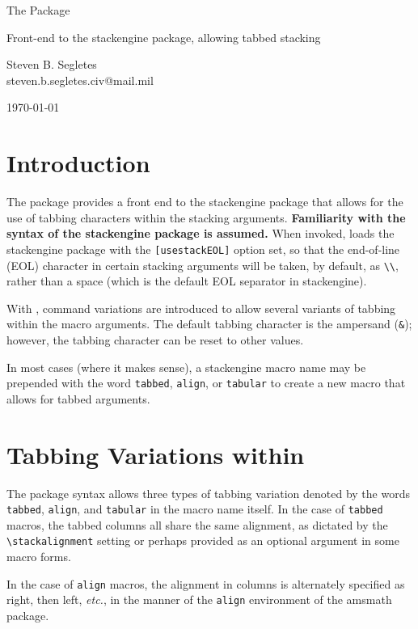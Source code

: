 \documentclass{article}
\def\ste{\textsf{stackengine}} \def\bs{\texttt{\char'134}} \let\vb\verb
\begin{document}
\begin{center} \LARGE The {\tst} Package\\ \rule{0em}{.7em}\small
Front-end to the {\ste} package, allowing tabbed stacking\\ \rule{0em}{2.7em}\large
Steven B. Segletes\\ steven.b.segletes.civ@mail.mil\\
\rule{0em}{1.7em}\today\\ \tabstackengineversionnumber \end{center}

\tableofcontents

\section{Introduction}

The {\tst} package provides a front end to the {\ste} package that
allows for the use of tabbing characters within the stacking arguments.
\textbf{Familiarity with the syntax of the {\ste} package is assumed.}
When invoked, {\tst} loads the {\ste} package with the
\texttt{[usestackEOL]} option set, so that the end-of-line (EOL)
character in certain stacking arguments will be taken, by default, 
as \vb|\\|, rather
than a space (which is the default EOL separator in \ste).

With \tst, command variations are introduced to allow several variants
of tabbing within the macro arguments. The default tabbing character is
the ampersand (\vb|&|); however, the tabbing character can be reset to
other values.

In most cases (where it makes sense), a {\ste} macro name may be
prepended with the word \texttt{tabbed}, \texttt{align}, or
\texttt{tabular} to create a new {\tst} macro that allows for tabbed
arguments.

\section{Tabbing Variations within \tst}

The {\tst} package syntax allows three types of tabbing variation
denoted by the words \texttt{tabbed}, \texttt{align}, and
\texttt{tabular} in the macro name itself. In the case of
\texttt{tabbed} macros, the tabbed columns all share the same alignment,
as dictated by the \vb|\stackalignment| setting or perhaps provided as
an optional argument in some macro forms.

In the case of \texttt{align} macros, the alignment in columns is
alternately specified as right, then left, \textit{etc.}, in the manner
of the \texttt{align} environment of the \textsf{amsmath} package.
\end{document}
